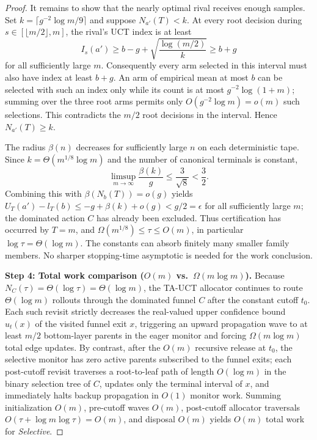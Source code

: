 \documentclass{article}
\theoremstyle{plain}
\theoremstyle{definition}
\begin{document}
\begin{proof}
It remains to show that the nearly optimal rival receives enough samples. Set $k=\lceil g^{-2}\log m/9\rceil$ and suppose $N_{a'}(T)<k$. At every root decision during $s\in[\lfloor m/2\rfloor,m]$, the rival's UCT index is at least
\[
I_s(a')\ge b-g+\sqrt{\frac{\log(m/2)}{k}}\ge b+g
\]
for all sufficiently large $m$. Consequently every arm selected in this interval must also have index at least $b+g$. An arm of empirical mean at most $b$ can be selected with such an index only while its count is at most $g^{-2}\log(1+m)$; summing over the three root arms permits only $O(g^{-2}\log m)=o(m)$ such selections. This contradicts the $m/2$ root decisions in the interval. Hence $N_{a'}(T)\ge k$.

The radius $\beta(n)$ decreases for sufficiently large $n$ on each deterministic tape. Since $k=\Theta(m^{1/8}\log m)$ and the number of canonical terminals is constant,
\[
\limsup_{m\to\infty}\frac{\beta(k)}{g}\le\frac{3}{\sqrt8}<\frac32.
\]
Combining this with $\beta(N_b(T))=o(g)$ yields
$U_T(a')-l_T(b)\le-g+\beta(k)+o(g)<g/2=\epsilon$ for all sufficiently large $m$; the dominated action $C$ has already been excluded. Thus certification has occurred by $T=m$, and
$\Omega(m^{1/8})\le\tau\le O(m)$, in particular $\log\tau=\Theta(\log m)$. The constants can absorb finitely many smaller family members. No sharper stopping-time asymptotic is needed for the work conclusion.


\medskip\noindent\textbf{Step 4: Total work comparison ($O(m)$ vs.\ $\Omega(m \log m)$).}
Because $N_C(\tau) = \Theta(\log \tau) = \Theta(\log m)$, the TA-UCT allocator continues to route $\Theta(\log m)$ rollouts through the dominated funnel $C$ after the constant cutoff $t_0$. Each such revisit strictly decreases the real-valued upper confidence bound $u_t(x)$ of the visited funnel exit $x$, triggering an upward propagation wave to at least $m/2$ bottom-layer parents in the eager monitor and forcing $\Omega(m \log m)$ total edge updates. By contrast, after the $O(m)$ recursive release at $t_0$, the selective monitor has zero active parents subscribed to the funnel exits; each post-cutoff revisit traverses a root-to-leaf path of length $O(\log m)$ in the binary selection tree of $C$, updates only the terminal interval of $x$, and immediately halts backup propagation in $O(1)$ monitor work. Summing initialization $O(m)$, pre-cutoff waves $O(m)$, post-cutoff allocator traversals $O(\tau+\log m\log\tau)=O(m)$, and disposal $O(m)$ yields $O(m)$ total work for \emph{Selective}.

\end{proof}
\end{document}
